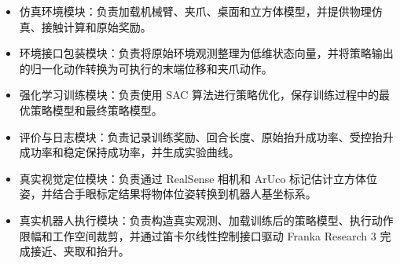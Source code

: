 \documentclass[
    type = bachelor,
    oneside,
    fontset = fandol
]{njuthesis}
\begin{document}
\begin{itemize}
  \item 仿真环境模块：负责加载机械臂、夹爪、桌面和立方体模型，并提供物理仿真、接触计算和原始奖励。
  \item 环境接口包装模块：负责将原始环境观测整理为低维状态向量，并将策略输出的归一化动作转换为可执行的末端位移和夹爪动作。
  \item 强化学习训练模块：负责使用 SAC 算法进行策略优化，保存训练过程中的最优策略模型和最终策略模型。
  \item 评价与日志模块：负责记录训练奖励、回合长度、原始抬升成功率、受控抬升成功率和稳定保持成功率，并生成实验曲线。
  \item 真实视觉定位模块：负责通过 RealSense 相机和 ArUco 标记估计立方体位姿，并结合手眼标定结果将物体位姿转换到机器人基坐标系。
  \item 真实机器人执行模块：负责构造真实观测、加载训练后的策略模型、执行动作限幅和工作空间裁剪，并通过笛卡尔线性控制接口驱动 Franka Research 3 完成接近、夹取和抬升。
\end{itemize}
\end{document}
